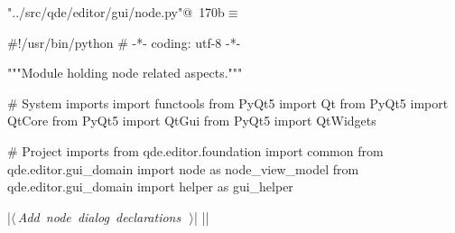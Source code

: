 \documentclass[%
    a4paper,    %
    justified,  %
    nobib,      %
    openany     %
]{tufte-book}
\begin{document}
\begin{flushleft} \small
\begin{minipage}{\linewidth}\label{scrap202}\raggedright\small
{} \verb@"../src/qde/editor/gui/node.py"@\nobreak\ {\footnotesize {170b}}$\equiv$
\vspace{-1ex}
\begin{pythoncode}
#!/usr/bin/python
# -*- coding: utf-8 -*-

"""Module holding node related aspects."""

# System imports
import functools
from PyQt5 import Qt
from PyQt5 import QtCore
from PyQt5 import QtGui
from PyQt5 import QtWidgets

# Project imports
from qde.editor.foundation import common
from qde.editor.gui_domain import node   as node_view_model
from qde.editor.gui_domain import helper as gui_helper


|\hbox{$\langle\,${\itshape Add node dialog declarations}\nobreak\ {\footnotesize {}}$\,\rangle$}|
|\NWsep|
\end{pythoncode}
\vspace{1.5ex}
\footnotesize
\begin{list}{}{\setlength{\itemsep}{-\parsep}\setlength{\itemindent}{-\leftmargin}}

\item{}
\end{list}
\end{minipage}\vspace{4ex}
\end{flushleft}
\end{document}
